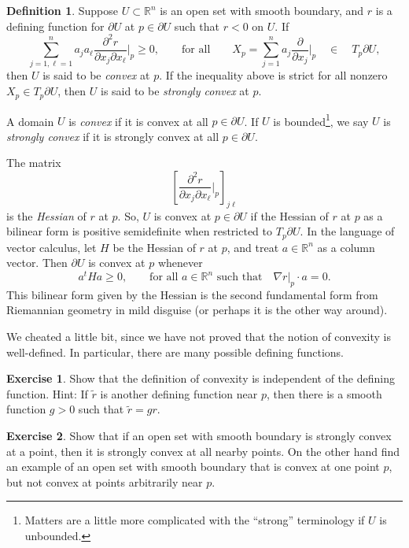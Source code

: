 \documentclass[12pt,openany]{book}
\newcommand{\R}{{\mathbb{R}}}
\newcommand{\myindex}[1]{#1\index{#1}}
\theoremstyle{plain}
\theoremstyle{remark}
\theoremstyle{definition}
\newtheorem{defn}[thm]{Definition}
\newenvironment{exbox}{%
    \def\FrameCommand{\vrule width 1pt \relax\hspace {10pt}}%
    \MakeFramed {\advance \hsize -\width \FrameRestore }%
}{%
    \endMakeFramed
}
\theoremstyle{exercise}
\newtheorem{exercise}{Exercise}[section]
\theoremstyle{example}
\begin{document}
\begin{defn}
Suppose $U \subset \R^n$ is an open set with
smooth boundary, %
and 
$r$ is a defining function for $\partial U$ at $p \in \partial
U$ such that $r < 0$ on $U$.
If
\begin{equation*}
\sum_{j=1,\ell=1}^n
a_j a_\ell \frac{\partial^2 r}{\partial x_j \partial x_\ell} \Big|_p \geq 0 ,
\qquad \text{for all} \qquad
X_p = \sum_{j=1}^n a_j 
\frac{\partial}{\partial x_j}\Big|_p \quad \in \quad T_p \partial U,
\end{equation*}
then $U$ is said to be \emph{\myindex{convex}} at $p$.  If the inequality
above is strict for all nonzero $X_p \in T_p \partial U$, then $U$ is said to be
\emph{\myindex{strongly convex}} at $p$.

A domain $U$ is \emph{convex} if it is convex at all $p \in \partial U$.
If $U$ is bounded\footnote{Matters are a little more complicated
with the ``strong'' terminology if $U$ is unbounded.}, we say
$U$ is \emph{strongly convex} if it is strongly convex at all $p \in
\partial U$.
\end{defn}

The matrix
\begin{equation*}
\left[ \frac{\partial^2 r}{\partial x_j \partial x_\ell} \Big|_p
\right]_{j\ell}
\end{equation*}
is the
\emph{\myindex{Hessian}} of $r$ at $p$.
So, $U$ is convex at $p \in \partial U$ if
the Hessian
of $r$ at $p$ as a bilinear form is positive semidefinite
when restricted to $T_p \partial U$.
In the language of vector calculus, let $H$ be the Hessian of $r$ at $p$, and treat
$a \in \R^n$ as a column vector.
Then 
$\partial U$ is convex at $p$ whenever
\begin{equation*}
a^t H a \geq 0 , \qquad \text{for all $a \in \R^n$ such that} \quad \nabla r|_p
\cdot a = 0 .
\end{equation*}
This bilinear form given by the Hessian is the second fundamental form from Riemannian
geometry in mild disguise (or perhaps it is the other way around).

We cheated a little bit, since we have not proved that
the notion of convexity is well-defined.  In particular, there are many possible
defining functions.

\begin{exbox}
\begin{exercise}
Show that the definition of convexity is independent of the defining
function.  Hint: If $\tilde{r}$ is another defining function near $p$,
then there is a smooth function $g > 0$ such that $\tilde{r} = g r$.
\end{exercise}

\begin{exercise}
Show that if an open set with smooth boundary is strongly convex at a point, then it is
strongly convex at all nearby points.  On the other hand find an example of
an open set with smooth boundary that is convex at one point $p$, but not convex at points
arbitrarily near $p$.
\end{exercise}
\end{exbox}
\end{document}
